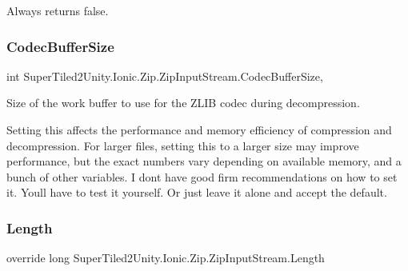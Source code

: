 Always returns false. 

\mbox{\label{class_super_tiled2_unity_1_1_ionic_1_1_zip_1_1_zip_input_stream_af44fff57aee1d3076896571b3e102937}} 
\subsubsection{\texorpdfstring{Codec\+Buffer\+Size}{CodecBufferSize}}
{\footnotesize\ttfamily int Super\+Tiled2\+Unity.\+Ionic.\+Zip.\+Zip\+Input\+Stream.\+Codec\+Buffer\+Size\hspace{0.3cm}{\ttfamily [get]}, {\ttfamily [set]}}



Size of the work buffer to use for the Z\+L\+IB codec during decompression. 

Setting this affects the performance and memory efficiency of compression and decompression. For larger files, setting this to a larger size may improve performance, but the exact numbers vary depending on available memory, and a bunch of other variables. I don\textquotesingle{}t have good firm recommendations on how to set it. You\textquotesingle{}ll have to test it yourself. Or just leave it alone and accept the default. \mbox{\label{class_super_tiled2_unity_1_1_ionic_1_1_zip_1_1_zip_input_stream_a02840abc14d29e5cd82ee0af6b814c21}} 
\subsubsection{\texorpdfstring{Length}{Length}}
{\footnotesize\ttfamily override long Super\+Tiled2\+Unity.\+Ionic.\+Zip.\+Zip\+Input\+Stream.\+Length\hspace{0.3cm}{\ttfamily [get]}}



